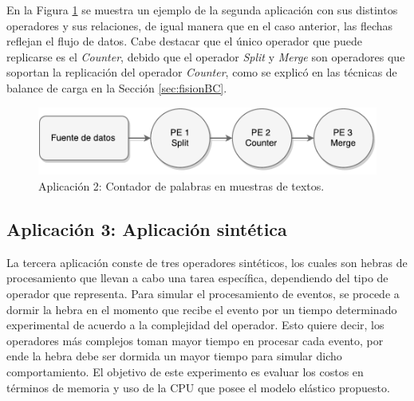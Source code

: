 En la Figura \ref{fig:segundaAplicacion} se muestra un ejemplo de la segunda aplicaci\'on con sus distintos operadores y sus relaciones, de igual manera que en el caso anterior, las flechas reflejan el flujo de datos. Cabe destacar que el \'unico operador que puede replicarse es el \textit{Counter}, debido que el operador \textit{Split} y \textit{Merge} son operadores que soportan la replicaci\'on del operador \textit{Counter}, como se explic\'o en las t\'ecnicas de balance de carga en la Secci\'on \ref{sec:fisionBC}.

\begin{figure}[!ht]
	\centering
		\includegraphics[scale=0.6]{images/App2.pdf}
	\caption{Aplicaci\'on 2: Contador de palabras en muestras de textos.}
	\label{fig:segundaAplicacion}
\end{figure}

\subsection{Aplicaci\'on 3: Aplicaci\'on sint\'etica}

La tercera aplicaci\'on conste de tres operadores sint\'eticos, los cuales son hebras de procesamiento que llevan a cabo una tarea espec\'ifica, dependiendo del tipo de operador que representa. Para simular el procesamiento de eventos, se procede a dormir la hebra en el momento que recibe el evento por un tiempo determinado experimental de acuerdo a la complejidad del operador. Esto quiere decir, los operadores m\'as complejos toman mayor tiempo en procesar cada evento, por ende la hebra debe ser dormida un mayor tiempo para simular dicho comportamiento. El objetivo de este experimento es evaluar los costos en t\'erminos de memoria y uso de la CPU que posee el modelo el\'astico propuesto.

